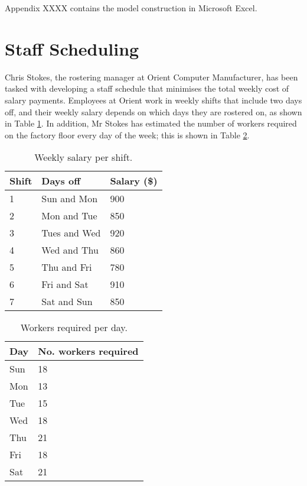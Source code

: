 \documentclass[11pt, a4paper]{article}
\begin{document}
    Appendix XXXX contains the model construction in Microsoft Excel.

    \newpage

    \section{Staff Scheduling}

    Chris Stokes, the rostering manager at Orient Computer Manufacturer, has been tasked with developing a staff schedule that minimises the total weekly cost of salary payments. Employees at Orient work in weekly shifts that include two days off, and their weekly salary depends on which days they are rostered on, as shown in Table \ref{shifts}. In addition, Mr Stokes has estimated the number of workers required on the factory floor every day of the week; this is shown in Table \ref{workers_needed}. 

    \begin{table}[!ht]
        \centering
        \caption{Weekly salary per shift.}
        \begin{tabular}{|l|l|l|}
            \hline
            Shift   & Days off      & Salary (\$)  \\ \hline
            1       & Sun and Mon   & 900          \\ \hline
            2       & Mon and Tue   & 850          \\ \hline
            3       & Tues and Wed  & 920          \\ \hline
            4       & Wed and Thu   & 860          \\ \hline
            5       & Thu and Fri   & 780          \\ \hline
            6       & Fri and Sat   & 910          \\ \hline
            7       & Sat and Sun   & 850          \\ \hline
        \end{tabular}
        \label{shifts}
    \end{table}

    \begin{table}[!ht]
        \centering
        \caption{Workers required per day.}
        \begin{tabular}{|l|l|}
            \hline
            Day     & No. workers required  \\ \hline
            Sun     & 18                    \\ \hline
            Mon     & 13                    \\ \hline
            Tue     & 15                    \\ \hline
            Wed     & 18                    \\ \hline
            Thu     & 21                    \\ \hline
            Fri     & 18                    \\ \hline
            Sat     & 21                    \\ \hline     
        \end{tabular}
        \label{workers_needed}
    \end{table}
\end{document}
